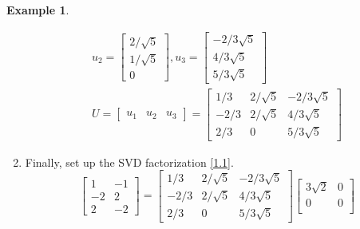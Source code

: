 \documentclass[12pt, reqno]{amsart}
\theoremstyle{definition}
\newtheorem{example}[theorem]{Example}
\theoremstyle{remark}
\numberwithin{equation}{section}
\begin{document}
\begin{example}
\begin{enumerate}
            \begin{equation}
                \begin{split}
                    u_2 = \begin{bmatrix}
                        2/\sqrt{5}\\
                        1/\sqrt{5}\\
                        0
                    \end{bmatrix},
                    u_3 = \begin{bmatrix}
                        -2/3\sqrt{5}\\
                        4/3\sqrt{5}\\
                        5/3\sqrt{5}
                    \end{bmatrix}\\
                    U = \begin{bmatrix}
                        u_1 & u_2 & u_3
                    \end{bmatrix}
                    = \begin{bmatrix}
                        1/3 & 2/\sqrt{5} & -2/3\sqrt{5}\\
                        -2/3 & 2/\sqrt{5} & 4/3\sqrt{5}\\
                        2/3 & 0 & 5/3\sqrt{5}
                    \end{bmatrix}
                \end{split}
            \end{equation}
        \item Finally, set up the SVD factorization \eqref{1.1}.
            \begin{equation}
                \begin{bmatrix}
                    1 & -1\\
                    -2 & 2\\
                    2 & -2
                \end{bmatrix}
                = \begin{bmatrix}
                    1/3 & 2/\sqrt{5} & -2/3\sqrt{5}\\
                    -2/3 & 2/\sqrt{5} & 4/3\sqrt{5}\\
                    2/3 & 0 & 5/3\sqrt{5}
                \end{bmatrix}
                \begin{bmatrix}
                    3\sqrt{2} & 0\\
                    0 & 0\\

\end{bmatrix}
\end{equation}
\end{enumerate}
\end{example}
\end{document}
